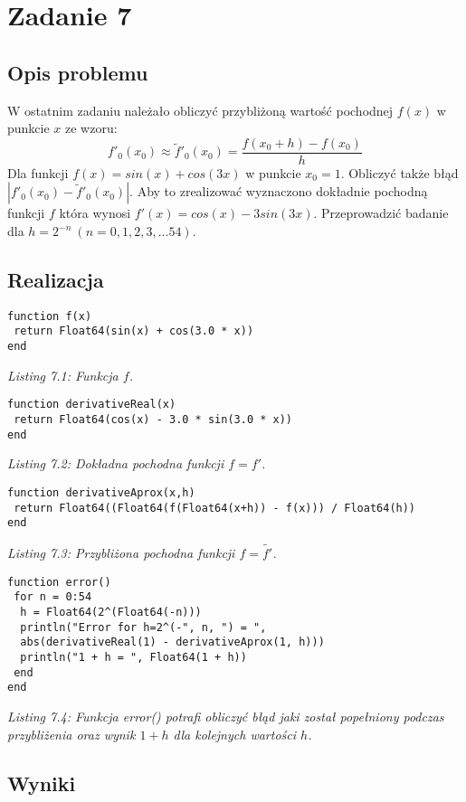 \documentclass[]{article}
\begin{document}
\section{Zadanie 7}
\subsection{Opis problemu}
W ostatnim zadaniu należało obliczyć przybliżoną wartość pochodnej \(f(x)\) w punkcie \(x\) ze wzoru: \[ f'_0(x_0) \approx  \tilde{f}'_0(x_0) = \frac{f(x_0 + h) - f(x_0)}{ h}\]
Dla funkcji \(f(x) = sin(x) + cos(3x)\) w punkcie \(x_0 = 1\). \newline Obliczyć także błąd \(|f'_0(x_0) - \tilde{f}'_0(x_0)|\). Aby to zrealizować wyznaczono dokładnie pochodną funkcji $f$ która wynosi \(f'(x)=cos(x)-3sin(3x)\).\newline
Przeprowadzić badanie dla \(h = 2^{-n} \: (n = 0,1,2,3,...54)\).
\subsection{Realizacja}
\begin{lstlisting}
function f(x)
 return Float64(sin(x) + cos(3.0 * x))
end
\end{lstlisting}
\textit{Listing 7.1: Funkcja $f$.}
\begin{lstlisting}
function derivativeReal(x) 
 return Float64(cos(x) - 3.0 * sin(3.0 * x))
end
\end{lstlisting}
\textit{Listing 7.2: Dokładna pochodna funkcji $f = f'$.}
\begin{lstlisting}
function derivativeAprox(x,h) 
 return Float64((Float64(f(Float64(x+h)) - f(x))) / Float64(h))
end
\end{lstlisting}
\textit{Listing 7.3: Przybliżona pochodna funkcji $f = \tilde{f'}$.}
\begin{lstlisting}
function error()
 for n = 0:54
  h = Float64(2^(Float64(-n)))
  println("Error for h=2^(-", n, ") = ",
  abs(derivativeReal(1) - derivativeAprox(1, h)))
  println("1 + h = ", Float64(1 + h))
 end
end
\end{lstlisting}
\textit{Listing 7.4: Funkcja error() potrafi obliczyć błąd jaki został popełniony podczas przybliżenia oraz wynik $1 + h$ dla kolejnych wartości $h$.}
\newpage
\subsection{Wyniki}
\end{document}
